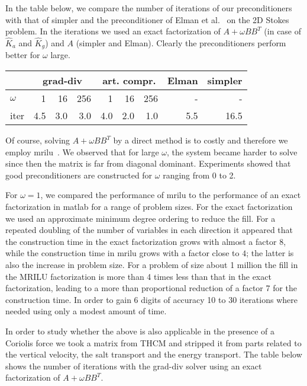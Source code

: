 \documentclass{report}
\begin{document}
In the table below, we compare the number of iterations of our
preconditioners with that of {\sc simpler} \cite{vuik02} and the
preconditioner of Elman et al.~\cite{elman2002} on the 2D Stokes
problem. In the iterations we used an exact factorization of
$A+\omega BB^T$ (in case of $\hat K_a$ and $\hat K_g$) and $A$
({\sc simpler} and Elman). Clearly the preconditioners perform
better for $\omega$ large.
\begin{center}
\begin{tabular}{l|rrr|rrr|r|r|}
&\multicolumn{3}{|c|}{\sc grad-div} &\multicolumn{3}{|c|}{\sc art.
compr.} &\sc Elman & \sc simpler\\
\hline
$\omega$ & 1 & 16 & 256 & 1 & 16 & 256 & - & - \\
\sc iter& 4.5 & 3.0 & 3.0& 4.0 & 2.0 & 1.0 & 5.5& 16.5 \\
\hline
\end{tabular}
\end{center}

Of course, solving $A+\omega BB^T$ by a direct method is to
costly and therefore we employ {\sc mrilu}~\cite{botta99}. We
observed that for large $\omega$, the system became harder to
solve since then the matrix is far from diagonal dominant.
Experiments showed that good preconditioners are constructed for
$\omega$ ranging from 0 to 2.

For $\omega=1$, we compared the performance of {\sc mrilu} to the
performance of an exact factorization in {\sc matlab} for a range
of problem sizes. For the exact factorization we used an
approximate minimum degree ordering to reduce the fill. For a
repeated doubling of the number of variables in each direction it
appeared that the construction time in the exact factorization
grows with almost a factor $8$, while the construction time in
{\sc mrilu} grows with a factor close to $4$; the latter is also
the increase in problem size. For a problem of size about 1
million the fill in the {\sc MRILU} factorization is more than 4
times less than that in the exact factorization, leading to a more
than proportional reduction of a factor 7 for the construction
time. In order to gain 6 digits of accuracy 10 to 30 iterations
where needed using only a modest amount of time.

In order to study whether the above is also applicable in the presence of a
Coriolis force we took a matrix from THCM and stripped it from parts related to
the vertical velocity, the salt transport and the energy
transport. The table below shows the number of iterations with the
grad-div solver using an exact factorization of $A+\omega BB^T$.
\end{document}
